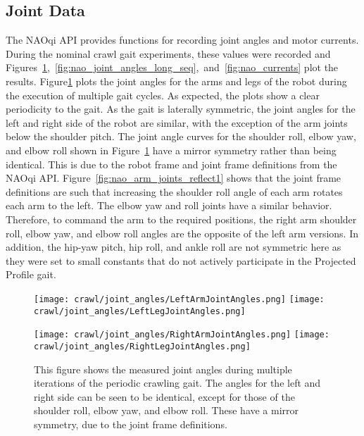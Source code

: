 \subsection{Joint Data} \label{subsec:nom_crawl_joint_data}
The NAOqi API provides functions for recording joint angles and motor currents. During the
nominal crawl gait experiments, these values were recorded and
Figures~\ref{fig:nao_joint_angles1},~\ref{fig:nao_joint_angles_long_seq},~and~\ref{fig:nao_currents} plot the results.
Figure\ref{fig:nao_joint_angles1} plots the joint angles for the arms and legs of the
robot during the execution of multiple gait cycles. As expected, the plots show a clear
periodicity to the gait.
As the gait is laterally symmetric, the joint angles for the left and right side of the robot
are similar, with the exception of the arm joints below the shoulder pitch.
The joint angle curves for the shoulder roll, elbow yaw, and elbow roll 
shown in Figure~\ref{fig:nao_joint_angles1} have a mirror symmetry rather than being identical.
This is due to the robot frame and joint frame definitions from the NAOqi API\@.
Figure~\ref{fig:nao_arm_joints_reflect1} shows that the joint frame definitions
are such that increasing the shoulder roll angle of each arm rotates each arm to the left.
The elbow yaw and roll joints have a similar behavior. Therefore, to command the arm to
the required positions, the right arm shoulder roll, elbow yaw, and elbow roll angles
are the opposite of the left arm versions.
In addition, the hip-yaw pitch, hip roll, and ankle roll are not symmetric here as they
were set to small constants that do not actively participate in the Projected Profile gait.

\begin{figure}
  \centerline{
    \texttt{[image: crawl/joint\_angles/LeftArmJointAngles.png]}
    \texttt{[image: crawl/joint\_angles/LeftLegJointAngles.png]}
  }
  \centerline{
    \texttt{[image: crawl/joint\_angles/RightArmJointAngles.png]}
    \texttt{[image: crawl/joint\_angles/RightLegJointAngles.png]}
  }
  \caption{This figure shows the measured joint angles during multiple iterations of the periodic crawling gait.
           The angles for the left and right side can be seen to be identical, except for those
           of the shoulder roll, elbow yaw, and elbow roll. These have a mirror symmetry, due to
           the joint frame definitions.}
  \label{fig:nao_joint_angles1}
\end{figure}


